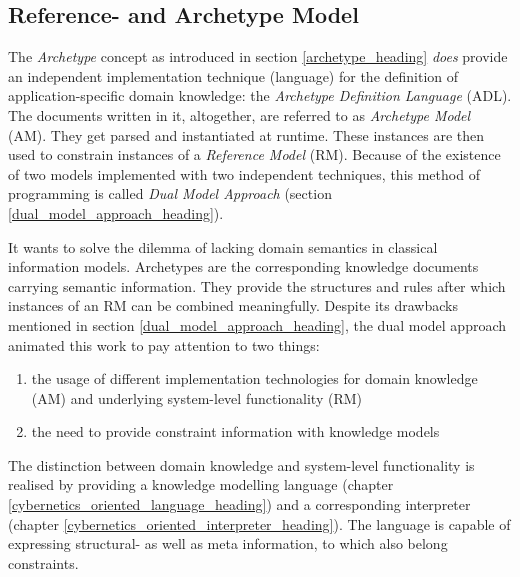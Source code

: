 %
%
%
%
%
%
%

\subsection{Reference- and Archetype Model}
\label{reference_and_archetype_model_heading}

The \emph{Archetype} concept as introduced in section \ref{archetype_heading}
\emph{does} provide an independent implementation technique (language) for the
definition of application-specific domain knowledge: the
\emph{Archetype Definition Language} (ADL). The documents written in it,
altogether, are referred to as \emph{Archetype Model} (AM). They get parsed and
instantiated at runtime. These instances are then used to constrain instances
of a \emph{Reference Model} (RM). Because of the existence of two models
implemented with two independent techniques, this method of programming is
called \emph{Dual Model Approach} (section \ref{dual_model_approach_heading}).

It wants to solve the dilemma of lacking domain semantics in classical
information models. Archetypes are the corresponding knowledge documents
carrying semantic information. They provide the structures and rules after
which instances of an RM can be combined meaningfully. Despite its drawbacks
mentioned in section \ref{dual_model_approach_heading}, the dual model approach
animated this work to pay attention to two things:

\begin{enumerate}
    \item the usage of different implementation technologies for domain
        knowledge (AM) and underlying system-level functionality (RM)
    \item the need to provide constraint information with knowledge models
\end{enumerate}

The distinction between domain knowledge and system-level functionality is
realised by providing a knowledge modelling language (chapter
\ref{cybernetics_oriented_language_heading}) and a corresponding interpreter
(chapter \ref{cybernetics_oriented_interpreter_heading}). The language is
capable of expressing structural- as well as meta information, to which also
belong constraints.
